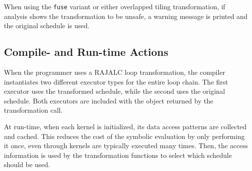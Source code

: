 When using the \verb.fuse. variant or either overlapped tiling transformation, if analysis shows the transformation to be unsafe, a warning message is printed and the original schedule is used. 
\subsection{Compile- and Run-time Actions}

When the programmer uses a RAJALC loop transformation, the compiler instantiates two different executor types for the entire loop chain. 
The first executor uses the transformed schedule, while the second uses the original schedule. 
Both executors are included with the object returned by the transformation call.

At run-time, when each kernel is initialized, its data access patterns are collected and cached. 
This reduces the cost of the symbolic evaluation by only performing it once, even through kernels are typically executed many times.
Then, the access information is used by the transformation functions to select which schedule should be used.

